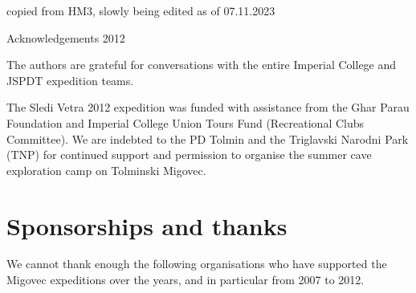 copied from HM3, slowly being edited as of 07.11.2023





Acknowledgements 2012

The authors are grateful for conversations with the entire Imperial
College and JSPDT expedition teams.

The Sledi Vetra 2012 expedition was funded with assistance from the Ghar
Parau Foundation and Imperial College Union Tours Fund (Recreational
Clubs Committee). We are indebted to the PD Tolmin and the Triglavski
Narodni Park (TNP) for continued support and permission to organise the
summer cave exploration camp on Tolminski Migovec.



\chapter{Sponsorships and thanks}
We cannot thank enough the following organisations who have supported the Migovec expeditions over the years, and in particular from 2007 to 2012.
